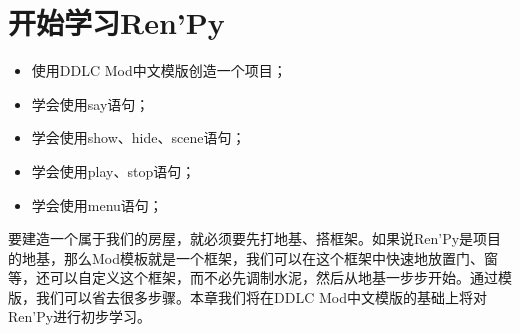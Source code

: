 \chapter{开始学习Ren'Py}

\begin{ChapterGoals}
    \begin{itemize}
        \item \FZFangSong 使用DDLC Mod中文模版创造一个项目；
        \item \FZFangSong 学会使用say语句；
        \item \FZFangSong 学会使用show、hide、scene语句；
        \item \FZFangSong 学会使用play、stop语句；
        \item \FZFangSong 学会使用menu语句；
    \end{itemize}
\end{ChapterGoals}

要建造一个属于我们的房屋，就必须要先打地基、搭框架。如果说Ren'Py是项目的地基，那么Mod模板就是一个框架，我们可以在这个框架中快速地放置门、窗等，还可以自定义这个框架，而不必先调制水泥，然后从地基一步步开始。通过模版，我们可以省去很多步骤。本章我们将在DDLC Mod中文模版的基础上将对Ren'Py进行初步学习。


